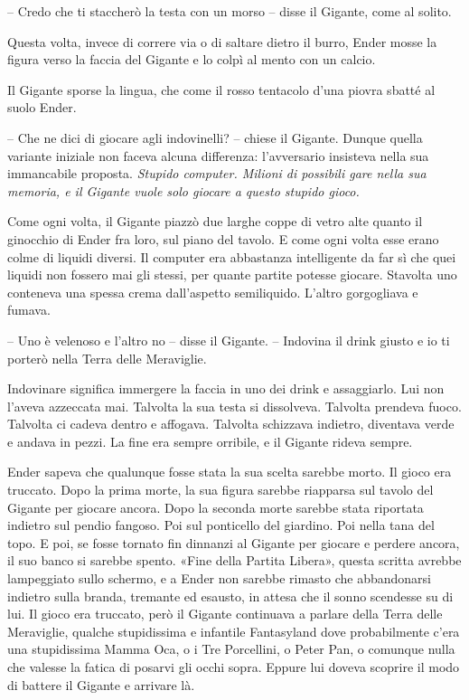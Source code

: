 {-- Credo che ti staccherò la testa con un morso -- disse il Gigante,
	come al solito.}

{Questa volta, invece di correre via o di saltare dietro il burro, Ender
	mosse la figura verso la faccia del Gigante e lo colpì al mento con un
	calcio.}

{Il Gigante sporse la lingua, che come il rosso tentacolo d'una piovra
	sbatté al suolo Ender.}

{-- Che ne dici di giocare agli indovinelli? -- chiese il Gigante.
	Dunque quella variante iniziale non faceva alcuna differenza:
	l'avversario insisteva nella sua immancabile proposta. \emph{Stupido
		computer. Milioni di possibili gare nella sua memoria, e il Gigante
		vuole solo giocare a questo stupido gioco.}}

{Come ogni volta, il Gigante piazzò due larghe coppe di vetro alte
	quanto il ginocchio di Ender fra loro, sul piano del tavolo. E come ogni
	volta esse erano colme di liquidi diversi. Il computer era abbastanza
	intelligente da far sì che quei liquidi non fossero mai gli stessi, per
	quante partite potesse giocare. Stavolta uno conteneva una spessa crema
	dall'aspetto semiliquido. L'altro gorgogliava e fumava.}

{-- Uno è velenoso e l'altro no -- disse il Gigante. -- Indovina il
	drink giusto e io ti porterò nella Terra delle Meraviglie.}

{Indovinare significa immergere la faccia in uno dei drink e
	assaggiarlo. Lui non l'aveva azzeccata mai. Talvolta la sua testa si
	dissolveva. Talvolta prendeva fuoco. Talvolta ci cadeva dentro e
	affogava. Talvolta schizzava indietro, diventava verde e andava in
	pezzi. La fine era sempre orribile, e il Gigante rideva sempre.}

{Ender sapeva che qualunque fosse stata la sua scelta sarebbe morto. Il
	gioco era truccato. Dopo la prima morte, la sua figura sarebbe riapparsa
	sul tavolo del Gigante per giocare ancora. Dopo la seconda morte sarebbe
	stata riportata indietro sul pendio fangoso. Poi sul ponticello del
	giardino. Poi nella tana del topo. E poi, se fosse tornato fin dinnanzi
	al Gigante per giocare e perdere ancora, il suo banco si sarebbe spento.
	«Fine della Partita Libera», questa scritta avrebbe lampeggiato sullo
	schermo, e a Ender non sarebbe rimasto che abbandonarsi indietro sulla
	branda, tremante ed esausto, in attesa che il sonno scendesse su di lui.
	Il gioco era truccato, però il Gigante continuava a parlare della Terra
	delle Meraviglie, qualche stupidissima e infantile Fantasyland dove
	probabilmente c'era una stupidissima Mamma Oca, o i Tre Porcellini, o
	Peter Pan, o comunque nulla che valesse la fatica di posarvi gli occhi
	sopra. Eppure lui doveva scoprire il modo di battere il Gigante e
	arrivare là.}


